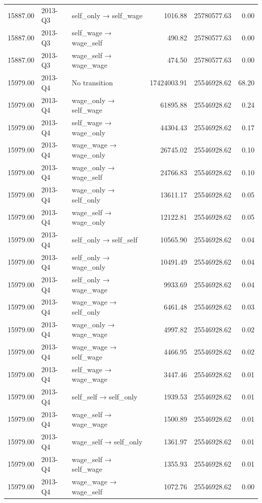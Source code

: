 \begin{table}[ht]
{\begin{tabular}{rllrrr}
  15887.00 & 2013-Q3 & self\_only → self\_wage & 1016.88 & 25780577.63 & 0.00 \\ 
  15887.00 & 2013-Q3 & self\_wage → wage\_self & 490.82 & 25780577.63 & 0.00 \\ 
  15887.00 & 2013-Q3 & wage\_self → wage\_wage & 474.50 & 25780577.63 & 0.00 \\ 
  15979.00 & 2013-Q4 & No transition & 17424003.91 & 25546928.62 & 68.20 \\ 
  15979.00 & 2013-Q4 & wage\_only → self\_wage & 61895.88 & 25546928.62 & 0.24 \\ 
  15979.00 & 2013-Q4 & self\_wage → wage\_only & 44304.43 & 25546928.62 & 0.17 \\ 
  15979.00 & 2013-Q4 & wage\_wage → wage\_only & 26745.02 & 25546928.62 & 0.10 \\ 
  15979.00 & 2013-Q4 & wage\_only → wage\_self & 24766.83 & 25546928.62 & 0.10 \\ 
  15979.00 & 2013-Q4 & wage\_only → self\_only & 13611.17 & 25546928.62 & 0.05 \\ 
  15979.00 & 2013-Q4 & wage\_self → wage\_only & 12122.81 & 25546928.62 & 0.05 \\ 
  15979.00 & 2013-Q4 & self\_only → self\_self & 10565.90 & 25546928.62 & 0.04 \\ 
  15979.00 & 2013-Q4 & self\_only → wage\_only & 10491.49 & 25546928.62 & 0.04 \\ 
  15979.00 & 2013-Q4 & self\_only → wage\_wage & 9933.69 & 25546928.62 & 0.04 \\ 
  15979.00 & 2013-Q4 & wage\_wage → self\_only & 6461.48 & 25546928.62 & 0.03 \\ 
  15979.00 & 2013-Q4 & wage\_only → wage\_wage & 4997.82 & 25546928.62 & 0.02 \\ 
  15979.00 & 2013-Q4 & wage\_wage → self\_wage & 4466.95 & 25546928.62 & 0.02 \\ 
  15979.00 & 2013-Q4 & self\_wage → wage\_wage & 3447.46 & 25546928.62 & 0.01 \\ 
  15979.00 & 2013-Q4 & self\_self → self\_only & 1939.53 & 25546928.62 & 0.01 \\ 
  15979.00 & 2013-Q4 & wage\_self → wage\_wage & 1500.89 & 25546928.62 & 0.01 \\ 
  15979.00 & 2013-Q4 & wage\_self → self\_only & 1361.97 & 25546928.62 & 0.01 \\ 
  15979.00 & 2013-Q4 & wage\_self → self\_wage & 1355.93 & 25546928.62 & 0.01 \\ 
  15979.00 & 2013-Q4 & wage\_wage → wage\_self & 1072.76 & 25546928.62 & 0.00 \\ 

\end{tabular}}
\end{table}
